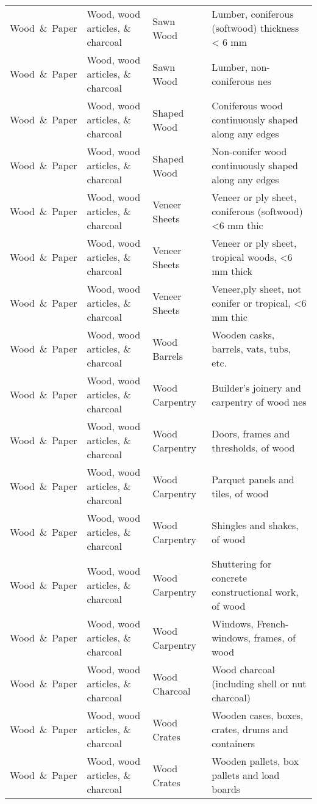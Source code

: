 \begin{appendices}
\begin{xltabular}{\textwidth}{|p{0.10\textwidth}|p{0.25\textwidth}|p{0.20\textwidth}|p{0.35\textwidth}|}
			Wood\ \&\ Paper & Wood, wood articles, \& charcoal & Sawn Wood & Lumber, coniferous (softwood) thickness < 6 mm \\
			Wood\ \&\ Paper & Wood, wood articles, \& charcoal & Sawn Wood & Lumber, non-coniferous nes \\
			Wood\ \&\ Paper & Wood, wood articles, \& charcoal & Shaped Wood & Coniferous wood continuously shaped along any edges \\
			Wood\ \&\ Paper & Wood, wood articles, \& charcoal & Shaped Wood & Non-conifer wood continuously shaped along any edges \\
			Wood\ \&\ Paper & Wood, wood articles, \& charcoal & Veneer Sheets & Veneer or ply sheet, coniferous (softwood) <6 mm thic \\
			Wood\ \&\ Paper & Wood, wood articles, \& charcoal & Veneer Sheets & Veneer or ply sheet, tropical woods, <6 mm thick \\
			Wood\ \&\ Paper & Wood, wood articles, \& charcoal & Veneer Sheets & Veneer,ply sheet, not conifer or tropical, <6 mm thic \\
			Wood\ \&\ Paper & Wood, wood articles, \& charcoal & Wood Barrels & Wooden casks, barrels, vats, tubs, etc. \\
			Wood\ \&\ Paper & Wood, wood articles, \& charcoal & Wood Carpentry & Builder's joinery and carpentry of wood nes \\
			Wood\ \&\ Paper & Wood, wood articles, \& charcoal & Wood Carpentry & Doors, frames and thresholds, of wood \\
			Wood\ \&\ Paper & Wood, wood articles, \& charcoal & Wood Carpentry & Parquet panels and tiles, of wood \\
			Wood\ \&\ Paper & Wood, wood articles, \& charcoal & Wood Carpentry & Shingles and shakes, of wood \\
			Wood\ \&\ Paper & Wood, wood articles, \& charcoal & Wood Carpentry & Shuttering for concrete constructional work, of wood \\
			Wood\ \&\ Paper & Wood, wood articles, \& charcoal & Wood Carpentry & Windows, French-windows, frames, of wood \\
			Wood\ \&\ Paper & Wood, wood articles, \& charcoal & Wood Charcoal & Wood charcoal (including shell or nut charcoal) \\
			Wood\ \&\ Paper & Wood, wood articles, \& charcoal & Wood Crates & Wooden cases, boxes, crates, drums and containers \\
			Wood\ \&\ Paper & Wood, wood articles, \& charcoal & Wood Crates & Wooden pallets, box pallets and load boards \\

\end{xltabular}
\end{appendices}
